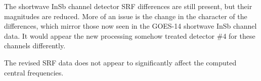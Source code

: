 The shortwave InSb channel detector SRF differences are still present, but their magnitudes are reduced. More of an issue is the change in the character of the differences, which mirror those now seen in the GOES-14 shortwave InSb channel data. It would appear the new processing somehow treated detector \#4 for these channels differently.

The revised SRF data does not appear to significantly affect the computed central frequencies.


\begin{appendix}
  
  
\end{appendix}



